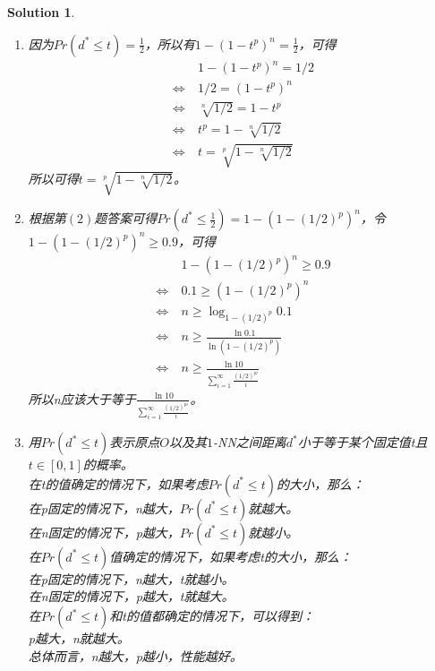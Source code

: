 \documentclass[a4paper,UTF8]{article}
\numberwithin{equation}{section}
\newtheorem*{mySol}{Solution}
\begin{document}
\begin{mySol}
\begin{enumerate}[(1)]
\item 
因为$Pr(d^*\leq t)=\frac{1}{2}$，所以有$1 - (1-t^p)^n = \frac{1}{2}$，可得
\begin{equation}
\begin{aligned}
&1 - (1-t^p)^n = 1/2\\
\Leftrightarrow\ &1/2 = (1-t^p)^n\\
\Leftrightarrow\ &\sqrt[n]{1/2} = 1-t^p\\
\Leftrightarrow\ &t^p = 1- \sqrt[n]{1/2}\\
\Leftrightarrow\ &t = \sqrt[p]{1- \sqrt[n]{1/2}}
\end{aligned}
\end{equation}
所以可得$t = \sqrt[p]{1- \sqrt[n]{1/2}}$。
\item 
根据第$(2)$题答案可得$Pr(d^* \leq \frac{1}{2}) = 1 - (1-(1/2)^p)^n$，令$1 - (1-(1/2)^p)^n \geq 0.9$，可得
\begin{equation}
\begin{aligned}
&1 - (1-(1/2)^p)^n \geq 0.9\\
\Leftrightarrow\ &0.1 \geq (1-(1/2)^p)^n\\
\Leftrightarrow\ &n \geq \log_{1-(1/2)^p}0.1\\
\Leftrightarrow\ &n \geq \frac{\ln 0.1}{\ln (1-(1/2)^p)}\\
\Leftrightarrow\ &n \geq \frac{\ln 10}{\sum_{i=1}^{\infty} \frac{(1/2)^{pi}}{i}}
\end{aligned}
\end{equation}
所以n应该大于等于$\frac{\ln 10}{\sum_{i=1}^{\infty} \frac{(1/2)^{pi}}{i}}$。
\item 
用$Pr(d^*\leq t)$表示原点$O$以及其$1$-NN之间距离$d^*$小于等于某个固定值t且$t\in [0,1]$的概率。\\
在t的值确定的情况下，如果考虑$Pr(d^*\leq t)$的大小，那么：\\
在p固定的情况下，n越大，$Pr(d^*\leq t)$就越大。\\
在n固定的情况下，p越大，$Pr(d^*\leq t)$就越小。\\
在$Pr(d^*\leq t)$值确定的情况下，如果考虑t的大小，那么：\\
在p固定的情况下，n越大，t就越小。\\
在n固定的情况下，p越大，t就越大。\\
在$Pr(d^*\leq t)$和t的值都确定的情况下，可以得到：\\
p越大，n就越大。\\
总体而言，n越大，p越小，性能越好。
\end{enumerate}
\end{mySol}
\newpage
\end{document}
